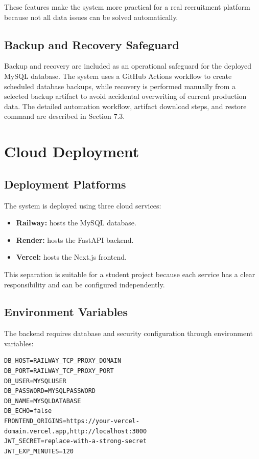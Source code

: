 \documentclass[11pt,a4paper]{report}
\begin{document}
These features make the system more practical for a real recruitment platform because not all data issues can be solved automatically.

\section{Backup and Recovery Safeguard}

Backup and recovery are included as an operational safeguard for the deployed MySQL database. The system uses a GitHub Actions workflow to create scheduled database backups, while recovery is performed manually from a selected backup artifact to avoid accidental overwriting of current production data. The detailed automation workflow, artifact download steps, and restore command are described in Section 7.3.

\chapter{Cloud Deployment}

\section{Deployment Platforms}

The system is deployed using three cloud services:

\begin{itemize}[leftmargin=1.5cm]
  \item \textbf{Railway:} hosts the MySQL database.
  \item \textbf{Render:} hosts the FastAPI backend.
  \item \textbf{Vercel:} hosts the Next.js frontend.
\end{itemize}

This separation is suitable for a student project because each service has a clear responsibility and can be configured independently.

\section{Environment Variables}

The backend requires database and security configuration through environment variables:

\begin{lstlisting}[caption={Backend environment variables}]
DB_HOST=RAILWAY_TCP_PROXY_DOMAIN
DB_PORT=RAILWAY_TCP_PROXY_PORT
DB_USER=MYSQLUSER
DB_PASSWORD=MYSQLPASSWORD
DB_NAME=MYSQLDATABASE
DB_ECHO=false
FRONTEND_ORIGINS=https://your-vercel-domain.vercel.app,http://localhost:3000
JWT_SECRET=replace-with-a-strong-secret
JWT_EXP_MINUTES=120
\end{lstlisting}
\end{document}
